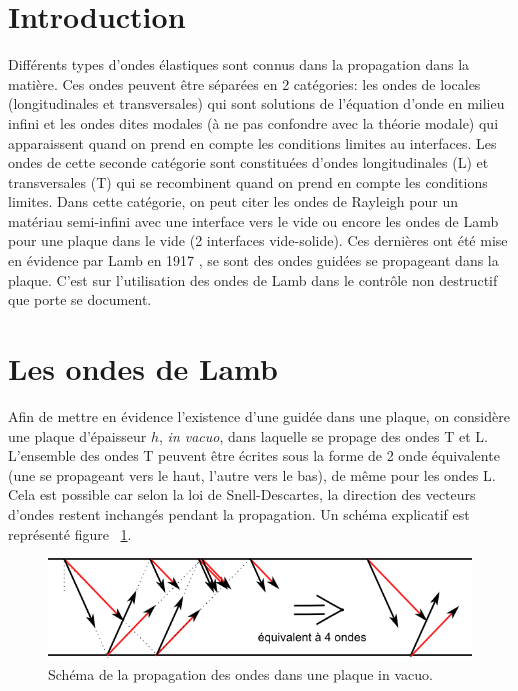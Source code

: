 \documentclass[twoside]{article}
\begin{document}
\begin{multicols}{2} %

\section{Introduction}
Différents types d'ondes élastiques sont connus dans la propagation dans la matière. Ces ondes peuvent être séparées en 2 catégories: les ondes de locales (longitudinales et transversales) qui sont solutions de l'équation d'onde en milieu infini et les ondes dites modales (à ne pas confondre avec la théorie modale) qui apparaissent quand on prend en compte les conditions limites au interfaces. Les ondes de cette seconde catégorie sont constituées d'ondes longitudinales (L) et transversales (T) qui se recombinent quand on prend en compte les conditions limites.  Dans cette  catégorie, on peut citer les ondes de Rayleigh pour un matériau semi-infini avec une interface vers le vide ou encore les ondes de Lamb pour une plaque dans le vide (2 interfaces vide-solide). Ces dernières ont été mise en évidence par Lamb en 1917 \cite{Lamb}, se sont des ondes guidées se propageant dans la plaque.
C'est sur l'utilisation des ondes de Lamb dans le contrôle non destructif que porte se document.

\section{Les ondes de Lamb}
Afin de mettre en évidence l’existence d'une guidée dans une plaque, on considère une plaque d'épaisseur $h$, \emph{in vacuo}, dans laquelle se propage des ondes T et L. L'ensemble des ondes T peuvent être écrites sous la forme de 2 onde équivalente (une se propageant vers le haut, l'autre vers le bas), de même pour les ondes L. Cela est possible car selon la loi de Snell-Descartes, la direction des vecteurs d'ondes restent inchangés pendant la propagation. Un schéma explicatif est représenté figure ~\ref{fig1}.


\begin{figure}[H]
\centering
\includegraphics[scale=0.5]{./images/lamb_expli.png}
\caption{\label{fig1} Schéma de la propagation des ondes dans une plaque in vacuo.}
\end{figure}


\end{multicols}
\end{document}
